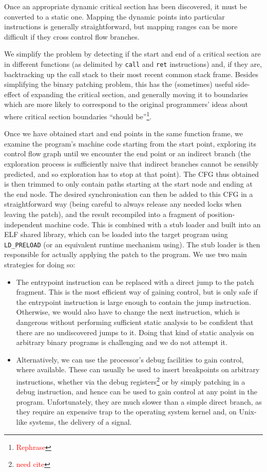 \documentclass[10pt,twocolumn,preprint,natbib,authoryear]{sigplanconf}
\newcommand{\editorial}[1]{\textcolor{red}{\footnote{\textcolor{red}{#1}}}}
\newcommand{\needCite}{\editorial{need cite}}
\begin{document}
Once an appropriate dynamic critical section has been discovered, it
must be converted to a static one.  Mapping the dynamic points into
particular instructions is generally straightforward, but mapping
ranges can be more difficult if they cross control flow branches.

We simplify the problem by detecting if the start and end of a
critical section are in different functions (as delimited by
\verb|call| and \verb|ret| instructions) and, if they are,
backtracking up the call stack to their most recent common stack
frame.  Besides simplifying the binary patching problem, this has the
(sometimes) useful side-effect of expanding the critical section, and
generally moving it to boundaries which are more likely to correspond
to the original programmers' ideas about where critical section
boundaries ``should be''\editorial{Rephrase}.

Once we have obtained start and end points in the same function frame,
we examine the program's machine code starting from the start point,
exploring its control flow graph until we encounter the end point or
an indirect branch (the exploration process is sufficiently naive that
indirect branches cannot be sensibly predicted, and so exploration has
to stop at that point).  The CFG thus obtained is then trimmed to only
contain paths starting at the start node and ending at the end node.
The desired synchronisation can then be added to this CFG in a
straightforward way (being careful to always release any needed locks
when leaving the patch), and the result recompiled into a fragment of
position-independent machine code.  This is combined with a stub
loader and built into an ELF shared library, which can be loaded into
the target program using \verb|LD_PRELOAD| (or an equivalent runtime
mechanism using).  The stub loader is then responsible for actually
applying the patch to the program.  We use two main strategies for
doing so:

\begin{itemize}
\item The entrypoint instruction can be replaced with a direct jump to
  the patch fragment.  This is the most efficient way of gaining
  control, but is only safe if the entrypoint instruction is large
  enough to contain the jump instruction.  Otherwise, we would also
  have to change the next instruction, which is dangerous without
  performing sufficient static analysis to be confident that there are
  no undiscovered jumps to it.  Doing that kind of static analysis on
  arbitrary binary programs is challenging and we do not attempt it.

\item Alternatively, we can use the processor's debug facilities to
  gain control, where available.  These can usually be used to insert
  breakpoints on arbitrary instructions, whether via the debug
  registers\needCite{} or by simply patching in a debug instruction,
  and hence can be used to gain control at any point in the program.
  Unfortunately, they are much slower than a simple direct branch, as
  they require an expensive trap to the operating system kernel and,
  on Unix-like systems, the delivery of a signal.
\end{itemize}
\end{document}

